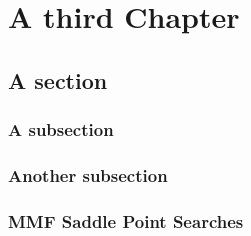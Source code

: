 
\chapter{A third Chapter}
\label{Chapter:3}

\section{A section}

\subsection{A subsection}
\lipsum[4]


\subsection{Another subsection}
\lipsum[5]


\subsection{MMF Saddle Point Searches}
\lipsum[6]